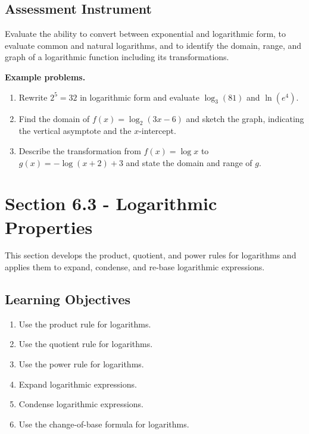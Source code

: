 \subsection{Assessment Instrument}
\label{ssec:asse-3669}

Evaluate the ability to convert between exponential and logarithmic form, to evaluate
common and natural logarithms, and to identify the domain, range, and graph of a
logarithmic function including its transformations.

\textbf{Example problems.}
\begin{enumerate}
    \item Rewrite $2^{5} = 32$ in logarithmic form and evaluate $\log_{3}(81)$ and $\ln(e^{4})$.
    \item Find the domain of $f(x) = \log_{2}(3x - 6)$ and sketch the graph, indicating the vertical asymptote and the $x$-intercept.
    \item Describe the transformation from $f(x) = \log x$ to $g(x) = -\log(x + 2) + 3$ and state the domain and range of $g$.
\end{enumerate}

\section{Section 6.3 - Logarithmic Properties}
\label{sec:sect-9905}

This section develops the product, quotient, and power rules for logarithms and applies
them to expand, condense, and re-base logarithmic expressions.

\subsection{Learning Objectives}
\label{ssec:lear-fe6e}

\begin{enumerate}
    \item Use the product rule for logarithms.
    \item Use the quotient rule for logarithms.
    \item Use the power rule for logarithms.
    \item Expand logarithmic expressions.
    \item Condense logarithmic expressions.
    \item Use the change-of-base formula for logarithms.
\end{enumerate}


